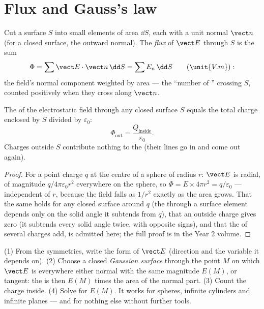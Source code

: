 \section{Flux and Gauss's law}

\begin{definition}\label{def:b1:electrostatics-gauss:flux}
Cut a surface $S$ into small elements of area $\dd S$, each with a unit
normal $\vect n$ (for a closed surface, the outward normal). The
\emph{flux} of $\vect E$ through $S$ is the sum
\[
\Phi = \sum \vect E\cdot\vect n\,\dd S = \sum E_n\,\dd S \qquad (\unit{V.m}):
\]
the field's normal component weighted by area --- the ``number of '' crossing $S$, counted positively when they cross along
$\vect n$.
\end{definition}

\begin{theorem}\label{thm:b1:electrostatics-gauss:gauss}
The  of the electrostatic field through any closed surface $S$
equals the total charge enclosed by $S$ divided by $\varepsilon_0$:
\[
\Phi_{\text{out}} = \frac{Q_{\text{inside}}}{\varepsilon_0} .
\]
Charges outside $S$ contribute nothing to the  (their lines go in
and come out again).
\end{theorem}

\begin{proof}
For a point charge $q$ at the centre of a sphere of radius $r$:
$\vect E$ is radial, of magnitude $q/4\pi\varepsilon_0r^2$ everywhere on the
sphere, so $\Phi = E \times 4\pi r^2 = q/\varepsilon_0$ --- independent of $r$,
because the field falls as $1/r^2$ exactly as the area grows. That the
same holds for any closed surface around $q$ (the  through a
surface element depends only on the solid angle it subtends from $q$),
that an outside charge gives zero (it subtends every solid angle twice,
with opposite signs), and that the  of several charges add, is
admitted here; the full proof is in the Year 2 volume.
\end{proof}

\begin{method}\label{meth:b1:electrostatics-gauss:gauss}
(1) From the symmetries, write the form of $\vect E$ (direction and the
variable it depends on). (2) Choose a closed \emph{Gaussian surface}
through the point $M$ on which $\vect E$ is everywhere either normal with
the same magnitude $E(M)$, or tangent: the  is then $E(M)$ times the
area of the normal part. (3) Count the charge inside. (4) Solve for
$E(M)$. It works for spheres, infinite cylinders and infinite planes
--- and for nothing else without further tools.
\end{method}

